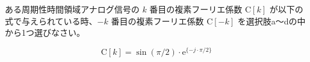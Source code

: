 ある周期性時間領域アナログ信号の $k$ 番目の複素フーリエ係数 $\textrm{C}[k]$ が以下の式で与えられている時、$-k$ 番目の複素フーリエ係数 $\textrm{C}[-k]$ を選択肢a〜dの中から1つ選びなさい。

\[
\textrm{C}[k] = \sin(\pi/2) \cdot \textrm{e}^{\{ -j \cdot \pi/2 \}}
\]
